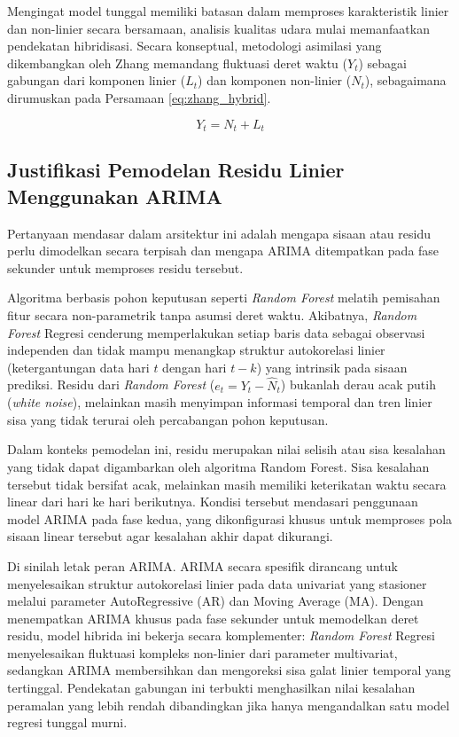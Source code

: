 Mengingat model tunggal memiliki batasan dalam memproses karakteristik linier dan non-linier secara bersamaan, analisis kualitas udara mulai memanfaatkan pendekatan hibridisasi. Secara konseptual, metodologi asimilasi yang dikembangkan oleh Zhang memandang fluktuasi deret waktu ($Y_t$) sebagai gabungan dari komponen linier ($L_t$) dan komponen non-linier ($N_t$), sebagaimana dirumuskan pada Persamaan \ref{eq:zhang_hybrid}.

\begin{equation}
Y_t = N_t + L_t
\label{eq:zhang_hybrid}
\end{equation}

\subsection{Justifikasi Pemodelan Residu Linier Menggunakan ARIMA}
Pertanyaan mendasar dalam arsitektur ini adalah mengapa sisaan atau residu perlu dimodelkan secara terpisah dan mengapa ARIMA ditempatkan pada fase sekunder untuk memproses residu tersebut.

\newpage

\raggedbottom

Algoritma berbasis pohon keputusan seperti \textit{Random Forest} melatih pemisahan fitur secara non-parametrik tanpa asumsi deret waktu. Akibatnya, \textit{Random Forest} Regresi cenderung memperlakukan setiap baris data sebagai observasi independen dan tidak mampu menangkap struktur autokorelasi linier (ketergantungan data hari $t$ dengan hari $t-k$) yang intrinsik pada sisaan prediksi. Residu dari \textit{Random Forest} ($e_t = Y_t - \hat{N}_t$) bukanlah derau acak putih (\textit{white noise}), melainkan masih menyimpan informasi temporal dan tren linier sisa yang tidak terurai oleh percabangan pohon keputusan.

Dalam konteks pemodelan ini, residu merupakan nilai selisih atau sisa kesalahan yang tidak dapat digambarkan oleh algoritma Random Forest. Sisa kesalahan tersebut tidak bersifat acak, melainkan masih memiliki keterikatan waktu secara linear dari hari ke hari berikutnya. Kondisi tersebut mendasari penggunaan model ARIMA pada fase kedua, yang dikonfigurasi khusus untuk memproses pola sisaan linear tersebut agar kesalahan akhir dapat dikurangi.

Di sinilah letak peran ARIMA. ARIMA secara spesifik dirancang untuk menyelesaikan struktur autokorelasi linier pada data univariat yang stasioner melalui parameter AutoRegressive (AR) dan Moving Average (MA). Dengan menempatkan ARIMA khusus pada fase sekunder untuk memodelkan deret residu, model hibrida ini bekerja secara komplementer: \textit{Random Forest} Regresi menyelesaikan fluktuasi kompleks non-linier dari parameter multivariat, sedangkan ARIMA membersihkan dan mengoreksi sisa galat linier temporal yang tertinggal. Pendekatan gabungan ini terbukti menghasilkan nilai kesalahan peramalan yang lebih rendah dibandingkan jika hanya mengandalkan satu model regresi tunggal murni.

